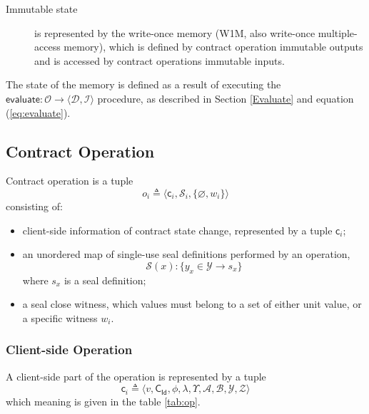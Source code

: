 \documentclass[9pt,oneside]{amsart}
\begin{document}
\begin{multicols}{2}
\begin{description}
\item[Immutable state] is represented by the \gls{write-once memory}
  (W1M, also write-once multiple-access memory),
  which is defined by contract operation immutable outputs
  and is accessed by contract operations immutable inputs.
\end{description}

The state of the memory is defined as a result of executing the
$\mathsf{evaluate}: \mathcal{O} \rightarrow \langle \mathcal{D}, \mathcal{I} \rangle$ procedure,
as described in Section \ref{Evaluate} and equation (\ref{eq:evaluate}).


\subsection{Contract Operation}\label{Operation}

Contract operation is a tuple
\begin{equation}\label{eq:op}
o_i \triangleq \big\langle \mathsf{c}_i, \mathcal{S}_i, \{ \varnothing, w_i \} \big\rangle
\end{equation}
\noindent
consisting of:
\noindent
\begin{itemize}
\item client-side information of contract state change, represented by a tuple $\mathsf{c}_i$;
\item an unordered map of single-use seal definitions performed by an operation,
\noindent
\begin{equation}\label{eq:seals}
  \mathcal{S}(x): \{ y_x \in \mathcal{Y} \rightarrow s_x \}
  \end{equation}
\noindent
where $s_x$ is a seal definition;
\item a \gls{seal close witness},
which values must belong to a set of either unit value, or a specific witness $w_i$.
\end{itemize}

\subsubsection{Client-side Operation}

A client-side part of the operation is represented by a tuple
\noindent
\begin{equation}
\mathsf{c}_i \triangleq \langle v, \mathsf{C_{Id}}, \phi, \lambda, \Upsilon, \mathcal{A}, \mathcal{B}, \mathcal{Y}, \mathcal{Z} \rangle
\end{equation}
\noindent
which meaning is given in the table \ref{tab:op}.


\end{multicols}
\end{document}
